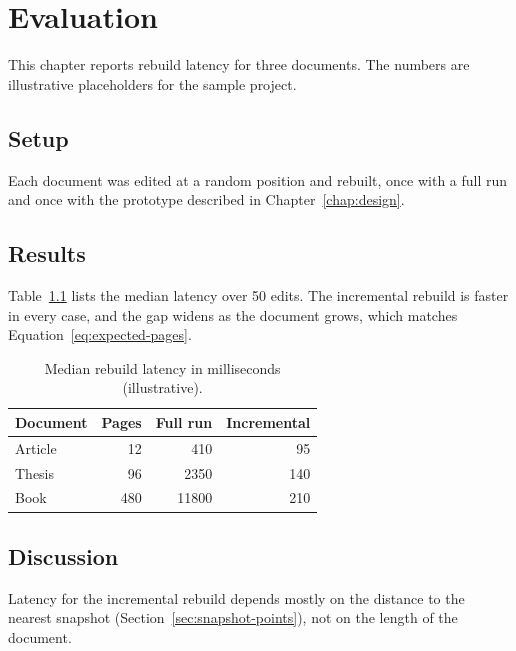 \chapter{Evaluation}
\label{chap:evaluation}

This chapter reports rebuild latency for three documents. The numbers are
illustrative placeholders for the sample project.

\section{Setup}
\label{sec:setup}

Each document was edited at a random position and rebuilt, once with a full
run and once with the prototype described in Chapter~\ref{chap:design}.

\section{Results}
\label{sec:results}

Table~\ref{tab:latency} lists the median latency over 50 edits. The
incremental rebuild is faster in every case, and the gap widens as the
document grows, which matches Equation~\ref{eq:expected-pages}.

\begin{table}[ht]
  \centering
  \caption{Median rebuild latency in milliseconds (illustrative).}
  \label{tab:latency}
  \begin{tabular}{lrrr}
    \toprule
    Document & Pages & Full run & Incremental \\
    \midrule
    Article  &    12 &      410 &          95 \\
    Thesis   &    96 &     2350 &         140 \\
    Book     &   480 &    11800 &         210 \\
    \bottomrule
  \end{tabular}
\end{table}

\section{Discussion}
\label{sec:discussion}

Latency for the incremental rebuild depends mostly on the distance to the
nearest snapshot (Section~\ref{sec:snapshot-points}), not on the length of
the document.
